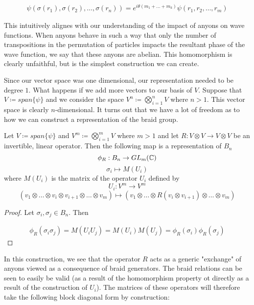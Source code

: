 \begin{equation}
	\begin{aligned}
		\psi(\sigma(r_1),\sigma(r_2),\hdots,\sigma(r_n)) = e^{i\theta(m_1+\hdots+m_k)} \psi(r_1,r_2,\hdots,r_m)
	\end{aligned}
\end{equation}

This intuitively alignes with our understanding of the impact of anyons on wave functions. When anyons behave in such a way that only the number of transpositions in the permutation of particles impacts the resultant phase of the wave function, we say that these anyons are abelian. This homomorphism is clearly unfaithful, but is the simplest construction we can create.

Since our vector space was one dimensional, our representation needed to be degree $1$. What happens if we add more vectors to our basis of $V$. Suppose that $V \coloneq span\{\psi\}$ and we consider the space $V^n\coloneq\bigotimes_{i=1}^nV$ where $n>1$. This vector space is clearly $n$-dimensional. It turns out that we have a lot of freedom as to how we can construct a representation of the braid group.

\begin{theorem}\cite{Riverside} 
	Let $V \coloneq span\{\psi\}$ and  $V^m\coloneq\bigotimes_{i=1}^mV$ where $m>1$ and let $R: V\otimes V \rightarrow V\otimes V $ be an invertible, linear operator. Then the following map is a representation of $B_n$
$$\phi_R:B_n\rightarrow GL_m(\mathbb{C})$$
$$\sigma_i \mapsto M(U_i)$$
where $M(U_i)$ is the matrix of the operator $U_i$ defined by
$$U_i:V^m\rightarrow V^m$$
$$(v_1\otimes\hdots\otimes v_i\otimes v_{i+1}\otimes\hdots\otimes v_m)\mapsto (v_1\otimes\hdots\otimes R(v_i\otimes v_{i+1})\otimes\hdots\otimes v_m)$$
\end{theorem}

\noindent \begin{proof} Let $\sigma_i,\sigma_j\in B_n$. Then

\begin{equation}
	\begin{aligned}
		\phi_R(\sigma_i\sigma_j) = M(U_iU_j) = M(U_i)M(U_j) =  \phi_R(\sigma_i)\phi_R(\sigma_j)
	\end{aligned}
\end{equation}
 \end{proof}

In this construction, we see that the operator $R$ acts as a generic "exchange" of anyons viewed as a consequence of braid generators. The braid relations can be seen to easily be valid (as a result of the homomorphism property ot directly as a result of the construction of $U_i$). The matrices of these operators will therefore take the following block diagonal form by construction:

